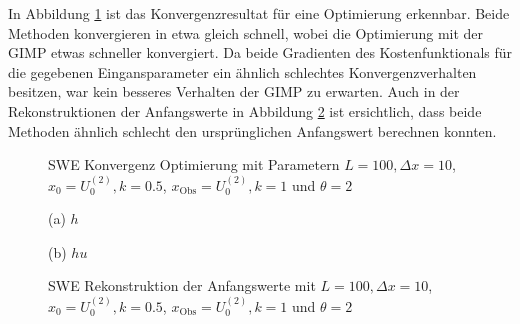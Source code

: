 In Abbildung \ref{fig:sweConvergenceOpt} ist das Konvergenzresultat für eine Optimierung erkennbar. Beide Methoden konvergieren in etwa gleich schnell, wobei die Optimierung mit der GIMP etwas schneller konvergiert. Da beide Gradienten des Kostenfunktionals für die gegebenen Eingansparameter ein ähnlich schlechtes Konvergenzverhalten besitzen, war kein besseres Verhalten der GIMP zu erwarten. Auch in der Rekonstruktionen der Anfangswerte in Abbildung \ref{fig:sweOptInitValues} ist ersichtlich, dass beide Methoden ähnlich schlecht den ursprünglichen Anfangswert berechnen konnten.
\begin{figure}[H]
\centering

\caption{SWE Konvergenz Optimierung mit Parametern $L=100,\Delta x=10$, $x_0=U_0^{(2)},k=0.5$, $x_{\text{Obs}} = U_0^{(2)}, k=1$ und $\theta=2$}
\label{fig:sweConvergenceOpt}
\end{figure}

\begin{figure}[H]
\begin{minipage}[b]{0.49\linewidth}
\centering

\caption*{(a) $h$}
\end{minipage}
\begin{minipage}[b]{0.49\linewidth}
\centering

\caption*{(b) $hu$}
\end{minipage}
\caption{SWE Rekonstruktion der Anfangswerte mit $L=100,\Delta x=10$, $x_0=U_0^{(2)},k=0.5$, $x_{\text{Obs}} = U_0^{(2)}, k=1$ und $\theta=2$}
\label{fig:sweOptInitValues}
\end{figure}

